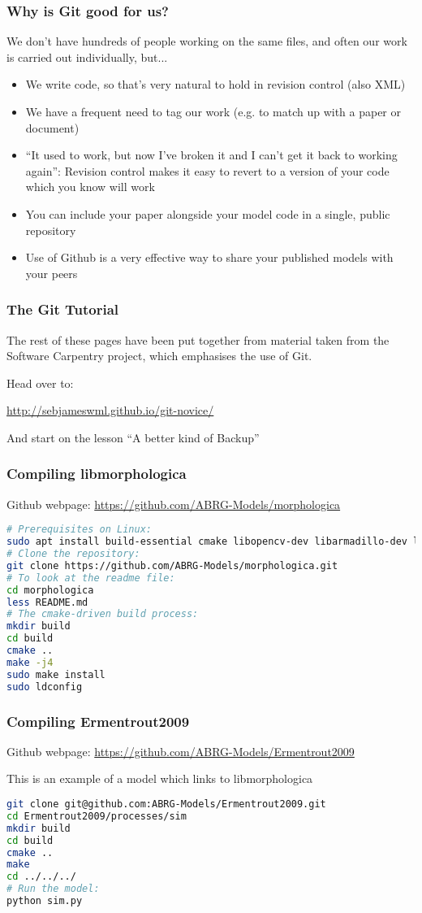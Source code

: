 \documentclass{beamer}
\begin{document}
\begin{frame}
  \frametitle{Why is Git good for us?}
  We don't have hundreds of people working on the same files, and
  often our work is carried out individually, but...
  \begin{itemize}
    \pause \item We write code, so that's very natural to hold in
    revision control (also XML)
    \pause \item We have a frequent need to \alert{tag} our work (e.g. to
    match up with a paper or document)
    \pause \item ``It used to work, but now I've broken it and I can't
    get it back to working again'': Revision control makes it easy to
    revert to a version of your code which you know will work
    \pause \item You can include your paper alongside your model code
    in a single, public repository
    \item Use of Github is a very effective way to share your
    published models with your peers
  \end{itemize}
\end{frame}

\begin{frame}
  \frametitle{The Git Tutorial}
  The rest of these pages have been put together from material taken
  from the Software Carpentry project, which emphasises the use of
  Git.

  Head over to:

  \url{http://sebjameswml.github.io/git-novice/}

  And start on the lesson ``A better kind of Backup''

\end{frame}

\begin{frame}[fragile]
  \frametitle{Compiling libmorphologica}
    Github webpage: \url{https://github.com/ABRG-Models/morphologica}

  \begin{lstlisting}[language=bash]
# Prerequisites on Linux:
sudo apt install build-essential cmake libopencv-dev libarmadillo-dev libglu1-mesa-dev libxmu-dev libxi-dev
# Clone the repository:
git clone https://github.com/ABRG-Models/morphologica.git
# To look at the readme file:
cd morphologica
less README.md
# The cmake-driven build process:
mkdir build
cd build
cmake ..
make -j4
sudo make install
sudo ldconfig\end{lstlisting}
\end{frame}

\begin{frame}[fragile]
  \frametitle{Compiling Ermentrout2009}
  Github webpage: \url{https://github.com/ABRG-Models/Ermentrout2009}

  This is an example of a model which links to libmorphologica
  \begin{lstlisting}[language=bash]
git clone git@github.com:ABRG-Models/Ermentrout2009.git
cd Ermentrout2009/processes/sim
mkdir build
cd build
cmake ..
make
cd ../../../
# Run the model:
python sim.py\end{lstlisting}
\end{frame}
\end{document}
